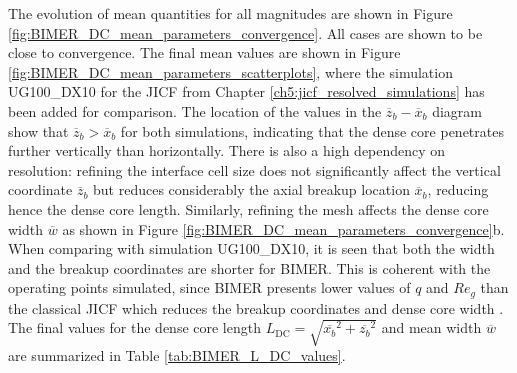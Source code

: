 The evolution of mean quantities for all magnitudes are shown in Figure \ref{fig:BIMER_DC_mean_parameters_convergence}. All cases are shown to be close to convergence. The final mean values are shown in Figure \ref{fig:BIMER_DC_mean_parameters_scatterplots}, where the simulation UG100\_DX10 for the JICF from Chapter \ref{ch5:jicf_resolved_simulations} has been added for comparison. The location of the values in the $\overline{z}_b - \overline{x}_b$ diagram show that $\overline{z}_b > \overline{x}_b$ for both simulations, indicating that the dense core penetrates further vertically than horizontally. There is also a high dependency on resolution: refining the interface cell size does not significantly affect the vertical coordinate $\overline{z}_b$ but reduces considerably the axial breakup location $\overline{x}_b$, reducing hence the dense core length. Similarly, refining the mesh affects the dense core width $\overline{w}$ as shown in Figure \ref{fig:BIMER_DC_mean_parameters_convergence}b.  When comparing with simulation UG100\_DX10, it is seen that both the width and the breakup coordinates are shorter for BIMER. This is coherent with the operating points simulated, since BIMER presents lower values of $q$ and $Re_g$ than the classical JICF which reduces the breakup coordinates and dense core width . The final values for the dense core length $L_\mathrm{DC} = \sqrt{\overline{x_b}^2 + \overline{z_b}^2}$ and mean width $\overline{w}$ are summarized in Table \ref{tab:BIMER_L_DC_values}.



